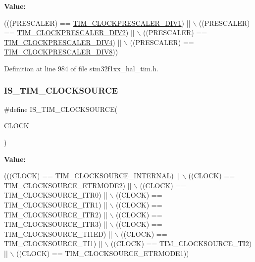 {\bfseries Value\+:}
\begin{DoxyCode}
(((PRESCALER) == \hyperlink{group___t_i_m___clock___prescaler_ga3462b444a059f001c6df33f55c756313}{TIM\_CLOCKPRESCALER\_DIV1}) || \(\backslash\)
                                          ((PRESCALER) == 
      \hyperlink{group___t_i_m___clock___prescaler_gac6457751c882644727982fda1fd029a5}{TIM\_CLOCKPRESCALER\_DIV2}) || \(\backslash\)
                                          ((PRESCALER) == 
      \hyperlink{group___t_i_m___clock___prescaler_ga11ce3686a0ee934384d0e4651823883d}{TIM\_CLOCKPRESCALER\_DIV4}) || \(\backslash\)
                                          ((PRESCALER) == 
      \hyperlink{group___t_i_m___clock___prescaler_ga86f147be5654631b21aa391a001401d5}{TIM\_CLOCKPRESCALER\_DIV8}))
\end{DoxyCode}


Definition at line 984 of file stm32f1xx\+\_\+hal\+\_\+tim.\+h.

\mbox{\label{group___t_i_m___private___macros_gafaf10dedf3c9c286591f3a76bc806cdb}} 
\subsubsection{\texorpdfstring{I\+S\+\_\+\+T\+I\+M\+\_\+\+C\+L\+O\+C\+K\+S\+O\+U\+R\+CE}{IS\_TIM\_CLOCKSOURCE}}
{\footnotesize\ttfamily \#define I\+S\+\_\+\+T\+I\+M\+\_\+\+C\+L\+O\+C\+K\+S\+O\+U\+R\+CE(\begin{DoxyParamCaption}\item[{}]{C\+L\+O\+CK }\end{DoxyParamCaption})}

{\bfseries Value\+:}
\begin{DoxyCode}
(((CLOCK) == TIM\_CLOCKSOURCE\_INTERNAL) || \(\backslash\)
                                   ((CLOCK) == TIM\_CLOCKSOURCE\_ETRMODE2) || \(\backslash\)
                                   ((CLOCK) == TIM\_CLOCKSOURCE\_ITR0)     || \(\backslash\)
                                   ((CLOCK) == TIM\_CLOCKSOURCE\_ITR1)     || \(\backslash\)
                                   ((CLOCK) == TIM\_CLOCKSOURCE\_ITR2)     || \(\backslash\)
                                   ((CLOCK) == TIM\_CLOCKSOURCE\_ITR3)     || \(\backslash\)
                                   ((CLOCK) == TIM\_CLOCKSOURCE\_TI1ED)    || \(\backslash\)
                                   ((CLOCK) == TIM\_CLOCKSOURCE\_TI1)      || \(\backslash\)
                                   ((CLOCK) == TIM\_CLOCKSOURCE\_TI2)      || \(\backslash\)
                                   ((CLOCK) == TIM\_CLOCKSOURCE\_ETRMODE1))
\end{DoxyCode}


